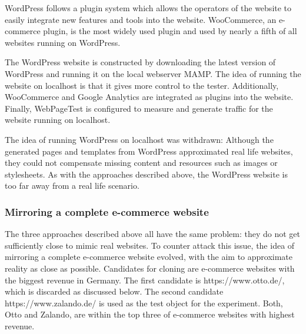 
WordPress follows a plugin system which allows the operators of the website to easily integrate new features and tools into the website.
WooCommerce, an e-commerce plugin, is the most widely used plugin and used by nearly a fifth of all websites running on WordPress.


The WordPress website is constructed by downloading the latest version of WordPress and running it on the local webserver MAMP.
The idea of running the website on localhost is that it gives more control to the tester.
Additionally, WooCommerce and Google Analytics are integrated as plugins into the website.
Finally, WebPageTest is configured to measure and generate traffic for the website running on localhost.


The idea of running WordPress on localhost was withdrawn:
Although the generated pages and templates from WordPress approximated real life websites, they could not compensate missing content and resources such as images or stylesheets.
As with the approaches described above, the WordPress website is too far away from a real life scenario.




\subsubsection{Mirroring a complete e-commerce website}


The three approaches described above all have the same problem: they do not get sufficiently close to mimic real websites.
To counter attack this issue, the idea of mirroring a complete e-commerce website evolved, with the aim to approximate reality as close as possible.
Candidates for cloning are e-commerce websites with the biggest revenue in Germany.
The first candidate is https://www.otto.de/, which is discarded as discussed below.
The second candidate https://www.zalando.de/ is used as the test object for the experiment.
Both, Otto and Zalando, are within the top three of e-commerce websites with highest revenue.

